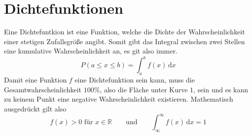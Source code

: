 \documentclass{article}
\begin{document}
\section{Dichtefunktionen}
Eine Dichtefuntkion ist eine Funktion, welche die Dichte der Wahrscheinlichkeit einer stetigen Zufallsgröße angibt. Somit gibt das Integral zwischen zwei Stellen eine kumulative Wahrscheinlichkeit an, es git also immer.
\[
 P(a \le x \le b) = \int_a^b f(x)\,\text{d}x 
\] 
Damit eine Funktion $f$ eine Dichtefunktion sein kann, muss die Gesamtwahrscheinlichkeit $100\%$, also die Fläche unter Kurve $1$, sein und es kann zu keinem Punkt eine negative Wahrscheinlichkeit existieren. Mathematisch ausgedrückt gilt also 
\[
 f(x) > 0 \text{ für } x \in \mathbb{R}
 \qquad \text{und} \qquad  
 \int_\infty^\infty f(x)\,\text{d}x = 1 
\]  
\end{document}
